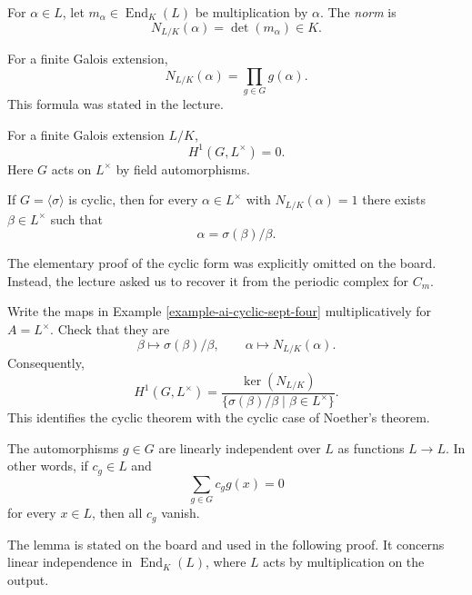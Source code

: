 \begin{definition}
\label{definition-galois-norm-4-sept}
For $\alpha\in L$, let
$m_\alpha\in\operatorname{End}_K(L)$
be multiplication by $\alpha$.
The \emph{norm} is
$$
N_{L/K}(\alpha)=\det(m_\alpha)\in K.
$$
\end{definition}

\noindent
For a finite Galois extension,
$$
N_{L/K}(\alpha)=\prod_{g\in G}g(\alpha).
$$
This formula was stated in the lecture.

\begin{theorem}[Noether]
\label{theorem-noether-hilbert-90-4-sept}
For a finite Galois extension $L/K$,
$$
H^1(G,L^{\times})=0.
$$
Here $G$ acts on $L^{\times}$ by field
automorphisms.
\end{theorem}

\begin{theorem}
\label{theorem-hilbert-90-cyclic-4-sept}
If $G=\langle\sigma\rangle$ is cyclic,
then for every $\alpha\in L^{\times}$
with $N_{L/K}(\alpha)=1$ there exists
$\beta\in L^{\times}$ such that
$$
\alpha=\sigma(\beta)/\beta.
$$
\end{theorem}

\noindent
The elementary proof of the cyclic form
was explicitly omitted on the board.
Instead, the lecture asked us to recover
it from the periodic complex for $C_m$.

\begin{exercise}
\label{exercise-hilbert-90-cyclic-4-sept}
Write the maps in Example
\ref{example-ai-cyclic-sept-four}
multiplicatively for $A=L^{\times}$.
Check that they are
$$
\beta\longmapsto\sigma(\beta)/\beta,
\qquad \alpha\longmapsto N_{L/K}(\alpha).
$$
Consequently,
$$
H^1(G,L^{\times})
=\frac{\ker(N_{L/K})}
{\{\sigma(\beta)/\beta
\mid\beta\in L^{\times}\}}.
$$
This identifies the cyclic theorem with
the cyclic case of Noether's theorem.
\end{exercise}

\begin{lemma}
\label{lemma-artin-4-sept}
The automorphisms $g\in G$ are linearly
independent over $L$ as functions $L\to L$.
In other words, if $c_g\in L$ and
$$
\sum_{g\in G}c_g g(x)=0
$$
for every $x\in L$, then all $c_g$ vanish.
\end{lemma}

\noindent
The lemma is stated on the board and
used in the following proof. It concerns
linear independence in
$\operatorname{End}_K(L)$, where $L$
acts by multiplication on the output.

